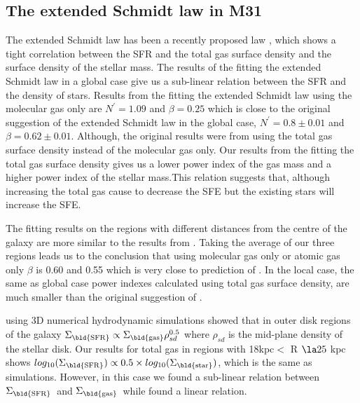 \documentclass[useAMS,usenatbib]{mn2e}
\newcommand \sigmagas    {$\Sigma_{\rm \bld {gas }}$\ }
\newcommand \eqsigmagas    {\Sigma_{\rm \bld {gas }}}
\newcommand \sigmasfr     {$\Sigma_{\rm \bld {SFR }}$\ }
\newcommand \eqsigmasfr     {\Sigma_{\rm \bld {SFR }}}
\newcommand \eqsigmastar    {\Sigma_{\rm \bld {star }}}
\newcommand \eqnprime {N^\prime}
\begin{document}
\subsection{The extended Schmidt law in M31}
\label{sec:es_res}
The extended Schmidt law has been a recently proposed law \citep{Shi11}, which shows a tight correlation between the SFR and the total gas surface density and the surface density of the stellar mass. The results of the fitting the extended Schmidt law in a global case give us a sub-linear relation between the SFR and the density of stars. Results from the fitting the extended Schmidt law using the molecular gas only are $\eqnprime = 1.09$ and $\beta = 0.25$ which is close to the original suggestion of the extended Schmidt law in the global case, $\eqnprime = 0.8 \pm 0.01$ and $\beta = 0.62\pm0.01$. Although, the original results were from using the total gas surface density instead of the molecular gas only. Our results from the fitting the total gas surface density gives us a lower power index of the gas mass and a higher power index of the stellar mass.This relation suggests that, although increasing the total gas cause to decrease the SFE but the existing stars will increase the SFE. 

 The fitting results on the regions with different distances from the centre of the galaxy are more similar to the results from \cite{Shi11}. Taking the average of our three regions leads us to the conclusion that using molecular gas only or atomic gas only $\beta$ is 0.60 and 0.55 which is very close to prediction of \cite{Shi11}. In the local case, the same as global case power indexes calculated using total gas surface density, are much smaller than the original suggestion of \cite{Shi11}. 
 
 \cite{Kim13} using 3D numerical hydrodynamic simulations showed that in outer disk regions of the galaxy $\eqsigmasfr \propto \eqsigmagas \rho_{sd}^{0.5}$ where $\rho_{sd}$ is the mid-plane density of the stellar disk. Our results for total gas in regions with 18kpc$<$ R $\la 25$ kpc shows $log_{10}(\eqsigmasfr) \propto 0.5 \times log_{10}(\eqsigmastar)$, which is the same as simulations. However, in this case we found a sub-linear relation between \sigmasfr and \sigmagas while \cite{Kim13} found a linear relation. 



\end{document}
